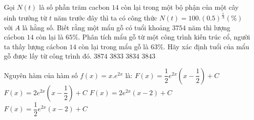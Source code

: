 \begin{ex}%
Gọi $N(t)$ là số phần trăm cacbon $14$ còn lại trong một bộ phận của một cây sinh trưởng từ $t$ năm trước đây thì ta có công thức 
$N(t) = 100. (0.5)^{\frac{t}{A}}(\%)$ với $A$ là hằng số. Biết rằng một mẩu gỗ có tuổi khoảng $3754$ năm thì lượng cácbon $14$ còn lại là $65\%$. Phân tích mẩu gỗ từ một công trình kiến trúc cổ, người ta thấy lượng cácbon $14$ còn lại trong mẩu gỗ là $63\%$. Hãy xác định tuổi của mẩu gỗ được lấy từ công trình đó.
\choice
{$3874$}
{\True $3833$}
{$3834$}
{$3843$}
\end{ex}
\begin{ex}%
Nguyên hàm của hàm số $f(x) =x.e^{2x}$ là:
\choice
{$F(x) = \dfrac{1}{2}e^{2x}\left(x-\dfrac{1}{2}\right)+C$}
{$F(x) = 2e^{2x}\left(x-\dfrac{1}{2}\right)+C$}
{$F(x) = 2e^{2x}\left(x-2\right)+C$}
{\True $F(x) = \dfrac{1}{2}e^{2x}\left(x-2\right)+C$}
\end{ex}
